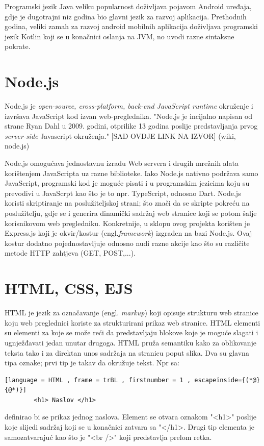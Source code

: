 \documentclass[times, utf8, zavrsni]{fer}
\begin{document}
	Programski jezik Java veliku popularnost doživljava pojavom Android uređaja, gdje je dugotrajni niz godina bio glavni jezik za razvoj aplikacija. Prethodnih godina, veliki zamah za razvoj android mobilnih aplikacija doživljava programski jezik 
	Kotlin koji se u konačnici oslanja na JVM, no uvodi razne sintaksne pokrate. 
	
	
	
	\section{Node.js}
	Node.js je \textit{open-source, cross-platform, back-end JavaScript runtime} okruženje i izvršava JavaScript kod izvan web-preglednika. "Node.js je incijalno napisan od strane  Ryan Dahl u 2009. godini, otprilike 13 godina poslije predstavljanja
	prvog  \textit{server-side} Javascript okruženja." [SAD OVDJE LINK NA IZVOR] (wiki, node.js)
	
	Node.js omogućava jednostavnu izradu Web servera i drugih mrežnih alata korištenjem JavaScripta uz razne biblioteke. Iako Node.js nativno podržava samo JavaScript, programski kod je moguće pisati i u programskim jezicima koju su prevodivi u JavaScrpt kao 
	što je to npr. TypeScript, odnosno Dart. Node.js koristi skriptiranje na poslužiteljskoj strani; što znači da se skripte pokreću na poslužitelju, gdje se i generira dinamički sadržaj web stranice koji se potom šalje korisnikovom web pregledniku. 
	Konkretnije, u sklopu ovog projekta korišten je Express.js koji je okvir/kostur (engl.\textit{framework}) izgrađen na bazi Node.js. Ovaj kostur dodatno pojednostavljuje odnosno nudi razne akcije kao što su različite metode HTTP zahtjeva (GET, POST,...).
	
	
	\section{HTML, CSS, EJS}
	HTML je jezik za označavanje (engl. \textit{markup}) koji opisuje strukturu web stranice koju web preglednici koriste za strukturirani prikaz web stranice. HTML elementi su elementi za koje se može reći da predstavljaju blokove koje je moguće slagati
	i ugnježđavati jedan unutar drugoga. HTML pruža semantiku kako za oblikovanje teksta tako i za direktan unos sadržaja na stranicu poput slika.
	Dva su glavna tipa oznake; prvi tip je takav da okružuje tekst. Npr sa: 
		\begin{lstlisting}[language = HTML , frame = trBL , firstnumber = 1 , escapeinside={(*@}{@*)}]
		<h1> Naslov </h1>
		\end{lstlisting}
		definirao bi se prikaz jednog naslova. Element se otvara oznakom "<h1>" poslije koje slijedi sadržaj koji se u konačnici zatvara sa "</h1>. Drugi tip elementa je samozatvarajuć kao što je "<br />" koji predstavlja prelom retka.
\end{document}
